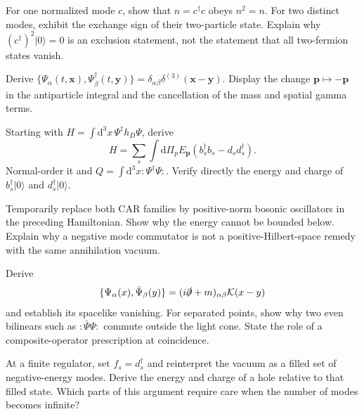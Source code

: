 \documentclass[11pt]{article}
\newcommand{\dd}{\mathrm{d}}
\newcommand{\vac}{\lvert0\rangle}
\begin{document}
\begin{parts}
\item For one normalized mode \(c\), show that \(n=c^\dagger c\) obeys
\(n^2=n\). For two distinct modes, exhibit the exchange sign of their
two-particle state. Explain why \((c^\dagger)^2\vac=0\) is an exclusion
statement, not the statement that all two-fermion states vanish.
\item Derive \(\{\Psi_\alpha(t,\bm x),\Psi_\beta^\dagger(t,\bm y)\}
=\delta_{\alpha\beta}\delta^{(3)}(\bm x-\bm y)\).
Display the change \(\bm p\mapsto-\bm p\) in the antiparticle integral
and the cancellation of the mass and spatial gamma terms.
\item Starting with \(H=\int\dd^3x\,\Psi^\dagger h_D\Psi\), derive
\[
 H=\sum_s\int\dd\Pi_p E_{\bm p}(b_s^\dagger b_s-d_sd_s^\dagger).
\]
Normal-order it and \(Q=\int\dd^3x:\Psi^\dagger\Psi:\).
Verify directly the energy and charge of \(b_s^\dagger\vac\) and
\(d_s^\dagger\vac\).
\item Temporarily replace both CAR families by positive-norm bosonic
oscillators in the preceding Hamiltonian. Show why the energy cannot
be bounded below. Explain why a negative mode commutator is not a
positive-Hilbert-space remedy with the same annihilation vacuum.
\item Derive
\[
 \{\Psi_\alpha(x),\bar\Psi_\beta(y)\}
 =(i\slashed\partial+m)_{\alpha\beta}\mathcal K(x-y)
\]
and establish its spacelike vanishing. For separated points, show why
two even bilinears such as \(:\bar\Psi\Psi:\) commute outside the light
cone. State the role of a composite-operator prescription at coincidence.
\item At a finite regulator, set \(f_s=d_s^\dagger\) and reinterpret the
vacuum as a filled set of negative-energy modes. Derive the energy and
charge of a hole relative to that filled state. Which parts of this
argument require care when the number of modes becomes infinite?
\end{parts}
\end{document}
